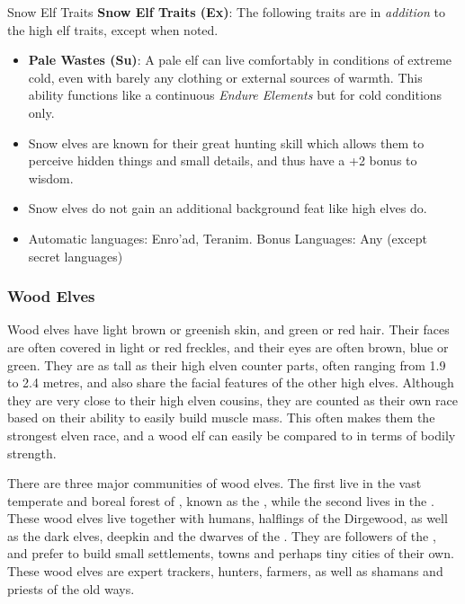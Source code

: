 \begin{35e}{Snow Elf Traits}
  \textbf{Snow Elf Traits (Ex)}: The following traits are in \emph{addition}
  to the high elf traits, except when noted.
  \begin{itemize}[noitemsep]
    \item \textbf{Pale Wastes (Su)}: A pale elf can live comfortably in
      conditions of extreme cold, even with barely any clothing or external
      sources of warmth. This ability functions like a continuous \emph{Endure
      Elements} but for cold conditions only.
    \item Snow elves are known for their great hunting skill which allows them
      to perceive hidden things and small details, and thus have a +2 bonus to
      wisdom.
    \item Snow elves do not gain an additional background feat like high elves
      do.
    \item Automatic languages: Enro'ad, Teranim. Bonus Languages: Any (except
      secret languages)
  \end{itemize}
\end{35e}

\subsubsection{Wood Elves}
\label{sec:Wood Elves}

Wood elves have light brown or greenish skin, and green or red hair. Their
faces are often covered in light or red freckles, and their eyes are often
brown, blue or green. They are as tall as their high elven counter parts,
often ranging from 1.9 to 2.4 metres, and also share the facial features of
the other high elves. Although they are very close to their high elven
cousins, they are counted as their own race based on their ability to easily
build muscle mass. This often makes them the strongest elven race, and a wood
elf can easily be compared to  in terms of bodily
strength.

There are three major communities of wood elves. The first live in the vast
temperate and boreal forest of , known as the
, while the second lives in the . These wood elves live together with humans, halflings of the
Dirgewood, as well as the dark elves, deepkin and the dwarves of the
. They are followers of the ,
and prefer to build small settlements, towns and perhaps tiny cities of their
own. These wood elves are expert trackers, hunters, farmers, as well as
shamans and priests of the old ways.

